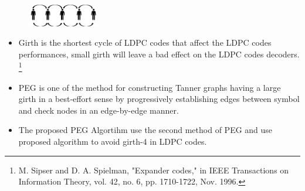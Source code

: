 \documentclass[11pt, aspectratio=169]{beamer}
\newcommand\blfootnote[1]{%
  \begingroup
  \renewcommand\thefootnote{}\footnote{#1}%
  \addtocounter{footnote}{-1}%
  \endgroup
}
\begin{document}
\begin{frame}
\begin{figure}
\begin{minipage}{.5\linewidth}
		\end{minipage}
			\hspace{ -1in}
		\begin{minipage}{.5\linewidth}
		\hspace{2.5cm}
		\includegraphics[width=1.25in]{gambarafa/soldier}
		\vspace{-1.95cm}
		
	\end{minipage}
	
	
		\label{gambar: ofdmhasil1}
	\end{figure}
	
	\vspace{1.15cm}
			\footnotesize
	\begin{itemize}

		\item Girth is the shortest cycle of LDPC codes that affect the LDPC codes performances, small girth will leave a bad effect on the LDPC codes decoders.\blfootnote{\tiny M. Sipser and D. A. Spielman, "Expander codes," in IEEE Transactions on Information Theory, vol. 42, no. 6, pp. 1710-1722, Nov. 1996.} 
		\item PEG is one of the method for constructing Tanner graphs having a large girth in a best-effort sense by progressively establishing edges between symbol and check nodes in an edge-by-edge manner.
		\item The proposed PEG Algortihm use the second method of PEG and use proposed algorithm to avoid girth-4 in LDPC codes.
		

\end{itemize}
\end{frame}
\end{document}

